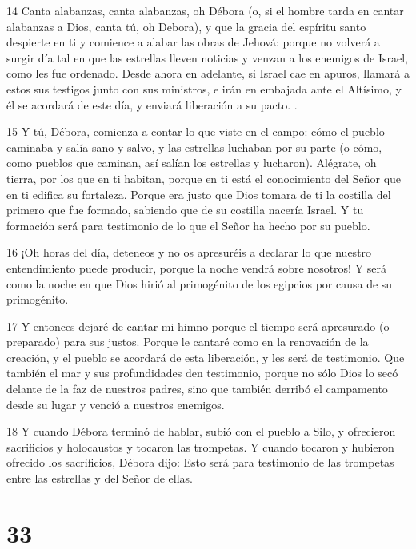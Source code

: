 \par 14 Canta alabanzas, canta alabanzas, oh Débora (o, si el hombre tarda en cantar alabanzas a Dios, canta tú, oh Debora), y que la gracia del espíritu santo despierte en ti y comience a alabar las obras de Jehová: porque no volverá a surgir día tal en que las estrellas lleven noticias y venzan a los enemigos de Israel, como les fue ordenado. Desde ahora en adelante, si Israel cae en apuros, llamará a estos sus testigos junto con sus ministros, e irán en embajada ante el Altísimo, y él se acordará de este día, y enviará liberación a su pacto. .

\par 15 Y tú, Débora, comienza a contar lo que viste en el campo: cómo el pueblo caminaba y salía sano y salvo, y las estrellas luchaban por su parte (o cómo, como pueblos que caminan, así salían los estrellas y lucharon). Alégrate, oh tierra, por los que en ti habitan, porque en ti está el conocimiento del Señor que en ti edifica su fortaleza. Porque era justo que Dios tomara de ti la costilla del primero que fue formado, sabiendo que de su costilla nacería Israel. Y tu formación será para testimonio de lo que el Señor ha hecho por su pueblo.

\par 16 ¡Oh horas del día, deteneos y no os apresuréis a declarar lo que nuestro entendimiento puede producir, porque la noche vendrá sobre nosotros! Y será como la noche en que Dios hirió al primogénito de los egipcios por causa de su primogénito.

\par 17 Y entonces dejaré de cantar mi himno porque el tiempo será apresurado (o preparado) para sus justos. Porque le cantaré como en la renovación de la creación, y el pueblo se acordará de esta liberación, y les será de testimonio. Que también el mar y sus profundidades den testimonio, porque no sólo Dios lo secó delante de la faz de nuestros padres, sino que también derribó el campamento desde su lugar y venció a nuestros enemigos.

\par 18 Y cuando Débora terminó de hablar, subió con el pueblo a Silo, y ofrecieron sacrificios y holocaustos y tocaron las trompetas. Y cuando tocaron y hubieron ofrecido los sacrificios, Débora dijo: Esto será para testimonio de las trompetas entre las estrellas y del Señor de ellas.

\chapter{33}

